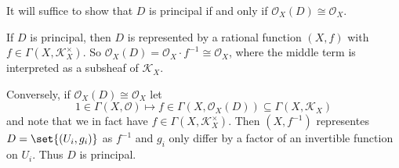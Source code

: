 It will suffice to show that $D$ is principal if and only if $\mathcal{O}_X(D)\cong \mathcal{O}_X$.

If $D$ is principal, then $D$ is represented by a rational function $(X, f)$ with
$f \in \Gamma(X, \mathcal{K}_X^\times)$. So $\mathcal{O}_X(D)= \mathcal{O}_X\cdot f^{-1}\cong \mathcal{O}_X$,
where the middle term is interpreted as a subsheaf of $\mathcal{K}_X$.

Conversely, if $\mathcal{O}_X(D)\cong \mathcal{O}_X$ let \[ 1 \in \Gamma(X, \mathcal{O})\mapsto f \in \Gamma(X, \mathcal{O}_X(D)) \subseteq \Gamma(X, \mathcal{K}_X) \]
and note that we in fact have $f \in \Gamma(X, \mathcal{K}_X^\times)$. Then
$(X, f^{-1})$ representes $D = \set{(U_i, g_i)}$ as $f^{-1} $ and $g_i$ only
differ by a factor of an invertible function on $U_i$. Thus $D$ is principal.

